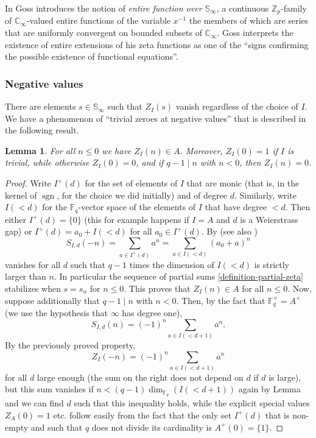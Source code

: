 \documentclass[11pt]{amsart}
\numberwithin{equation}{section}
\newcommand{\ZZ}{\mathbb{Z}}
\newcommand{\FF}{\mathbb{F}}
\newcommand{\CC}{\mathbb{C}}
\newcommand{\sgn}{\operatorname{sgn}}
\newtheorem{Lemma}[Theorem]{Lemma}
\begin{document}
In \cite[Definition 8.5.1]{GOS} Goss introduces the notion of {\em entire function over $\mathbb{S}_\infty$}, a continuous $\ZZ_p$-family of $\CC_\infty$-valued entire functions of the variable $x^{-1}$ the members of which are series that are uniformly convergent on bounded subsets of $\CC_\infty$.
Goss interprets the existence of entire extensions of his zeta functions as one of the ``signs confirming the possible existence of functional equations''.

\subsubsection{Negative values}\label{negative-values}
There are elements $s\in\mathbb{S}_\infty$ such that $Z_I(s)$ vanish regardless of the choice of $I$. We have a phenomenon of ``trivial zeroes at negative values'' that is described in the following result.
\begin{Lemma}\label{lemma-partial-negative}
For all $n\leq 0$ we have $Z_I(n)\in A$. Moreover, $Z_I(0)=1$ if $I$ is trivial, while otherwise $Z_I(0)=0$, and if $q-1\mid n$ with $n<0$, then
$Z_I(n)=0$.
\end{Lemma} 

\begin{proof}
Write $I^+(d)$ for the set of elements of $I$ that are monic (that is, in the kernel of
$\sgn$, for the choice we did initially) and of degree $d$. Similarly, write $I(<d)$ for the $\FF_q$-vector space of the elements of $I$ that 
have degree $<d$. Then either $I^+(d)=\{0\}$ (this for example happens if $I=A$ and $d$ is a Weierstrass gap) or   
$I^+(d)=a_0+I(<d)$ for all $a_0\in I^+(d)$. By \cite[Lemma 8.8.1]{GOS} (see also \cite[Theorem 5.3.1]{THA0})
$$S_{I,d}(-n)=\sum_{a\in I^+(d)}a^n=\sum_{a\in I(<d)}(a_0+a)^n$$
vanishes for all $d$ such that $q-1$ times the dimension of $I(<d)$ is strictly larger than $n$. In particular the sequence of 
partial sums \eqref{definition-partial-zeta} stabilizes when $s=s_n$ for $n\leq 0$.
This proves that 
$Z_I(n)\in A$ for all $n\leq 0$. Now, suppose additionally that $q-1\mid n$ with $n<0$. Then, by the fact that $\FF_q^\times=A^\times$
(we use the hypothesis that $\infty$ has degree one),
$$S_{I,d}(n)=(-1)^n\sum_{a\in I(<d+1)}a^n.$$
By the previously proved property, 
$$Z_I(-n)=(-1)^n\sum_{a\in I(<d+1)}a^n$$
for all $d$ large enough (the sum on the right does not depend on $d$ if $d$ is large), but this sum vanishes if $n<(q-1)\dim_{\FF_q}(I(<d+1))$ again by Lemma \cite[Lemma 8.8.1]{GOS} and we can find $d$ such that this inequality holds, while the explicit special values $Z_A(0)=1$ etc. follow easily from the fact that the only set $I^+(d)$ that is non-empty and such that $q$ does not divide its cardinality is $A^+(0)=\{1\}$.
\end{proof}
\end{document}
